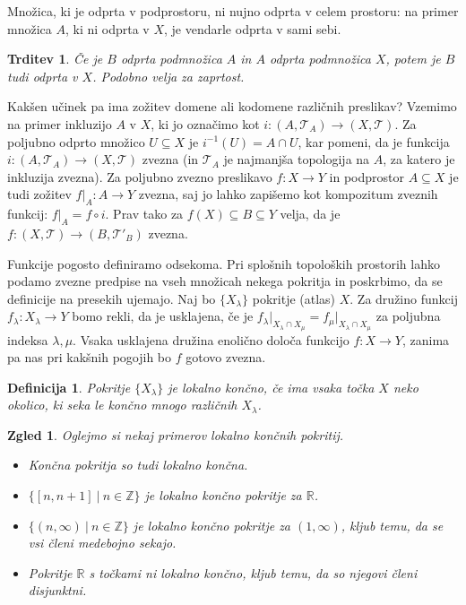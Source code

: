 \documentclass[10pt, a4paper]{article}
\newtheorem{trditev}[izr]{Trditev}
\newtheorem{defi}{Definicija}[section]
\newenvironment{noticeB}{%
  \tcolorbox[%
  notitle,
  empty,
  enhanced,  %
  breakable,
  coltext=black,
  colback=white, 
  fontupper=\rmfamily,
  parbox=false,
  noparskip,
  sharp corners,
  boxrule=-1pt,  %
  frame hidden,
  left=7pt,  %
  right=7pt,
  top=5pt,
  bottom=5pt,
  before skip=2.5ex plus 2pt,
  after skip=2.5ex plus 2pt,
  borderline west = {1.5pt}{-0.1pt}{blue!30!black}, %
  overlay unbroken and last={%
    \draw[color=black, line width=1.25pt]
    ($(frame.south west)+(1.pt, -0.1pt)$) -- ++(2em, 0);
  }
  ]}
{\endtcolorbox}
\newenvironment{definicija}{\begin{noticeB}\begin{defi}}{%
    \end{defi}\end{noticeB}}
\newtheorem{zgled}{Zgled}[section]
\newcommand{\Z}{\mathbb {Z}}
\newcommand{\R}{\mathbb {R}}
\newcommand{\topo}[1]{\mathcal{#1}}
\begin{document}
Množica, ki je odprta v podprostoru, ni nujno odprta v celem prostoru:
na primer množica $A$, ki ni odprta v $X$, je vendarle odprta v sami sebi.

\begin{trditev}
  Če je $B$ odprta podmnožica $A$ in $A$ odprta podmnožica $X$, potem je $B$ tudi odprta v $X$.
  Podobno velja za zaprtost.
\end{trditev}

Kakšen učinek pa ima zožitev domene ali kodomene različnih preslikav?
Vzemimo na primer inkluzijo $A$ v $X$, ki jo označimo kot $i: (A, \topo{T}_A) \to (X, \topo{T})$.
Za poljubno odprto množico $U \subseteq X$ je $i^{-1} (U) = A \cap U$,
kar pomeni, da je funkcija $i: (A, \topo{T}_A) \to (X, \topo{T})$ zvezna (in $\topo{T}_A$ je najmanjša topologija na $A$,
za katero je inkluzija zvezna).
Za poljubno zvezno preslikavo $f: X \to Y$ in podprostor $A \subseteq X$
je tudi zožitev $f \big|_A : A \to Y$ zvezna, saj jo lahko zapišemo kot kompozitum zveznih funkcij: $f \big|_A = f \circ i$.
Prav tako za $f(X) \subseteq B \subseteq Y$ velja, da je $f: (X, \topo{T}) \to (B, \topo{T}'_B)$ zvezna.

Funkcije pogosto definiramo odsekoma. Pri splošnih topoloških prostorih lahko podamo zvezne predpise na vseh množicah nekega pokritja
in poskrbimo, da se definicije na presekih ujemajo. Naj bo $\{X_\lambda\}$ pokritje (atlas) $X$.
Za družino funkcij $f_\lambda: X_\lambda \to Y$ bomo rekli, da je usklajena, če je 
$f_\lambda \big|_{X_\lambda \cap X_\mu} = f_\mu \big|_{X_\lambda \cap X_\mu}$ za poljubna indeksa $\lambda, \mu$.
Vsaka usklajena družina enolično določa funkcijo $f: X \to Y$, zanima pa nas pri kakšnih pogojih bo $f$ gotovo zvezna.

\begin{definicija}
  Pokritje $\{X_\lambda\}$ je lokalno končno, če ima vsaka točka $X$ neko okolico, ki seka le končno mnogo različnih $X_\lambda$.
\end{definicija}

\begin{zgled}
  Oglejmo si nekaj primerov lokalno končnih pokritij.
  \begin{itemize}
    \item Končna pokritja so tudi lokalno končna.
    \item $\{[n, n+1]\ |\ n \in \Z\}$ je lokalno končno pokritje za $\R$.
    \item $\{(n, \infty)\ |\ n \in \Z\}$ je lokalno končno pokritje za $(1, \infty)$, 
    kljub temu, da se vsi členi medebojno sekajo.
    \item Pokritje $\R$ s točkami ni lokalno končno, kljub temu, da so njegovi členi disjunktni.
  \end{itemize}
\end{zgled}
\end{document}
